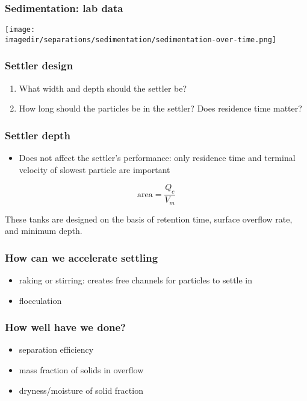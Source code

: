 \begin{frame}\frametitle{Sedimentation: lab data}
	\begin{center}
		\texttt{[image: \\imagedir/separations/sedimentation/sedimentation-over-time.png]}
	\end{center}
\end{frame}

\begin{frame}\frametitle{Settler design}
	\begin{enumerate}
		\item	What width and depth should the settler be?
		\item	How long should the particles be in the settler? Does residence time matter?
	\end{enumerate}
\end{frame}

\begin{frame}\frametitle{Settler depth}
	\begin{itemize}
		\item	Does not affect the settler's performance: only residence time and terminal velocity of slowest particle are important
	\end{itemize}
	
	\[
		\text{area} = \frac{Q_c}{V_m}
	\]
	
	
	\vspace{12pt}
	These tanks are designed on the basis of retention time, surface overflow rate, and minimum depth. 
\end{frame}

\begin{frame}\frametitle{How can we accelerate settling}
	\begin{itemize}
		\item	raking or stirring: creates free channels for particles to settle in
		\item	flocculation
	\end{itemize}
\end{frame}

\begin{frame}\frametitle{How well have we done?}
	\begin{itemize}
		\item	separation efficiency
		\item	mass fraction of solids in overflow
		\item	dryness/moisture of solid fraction
	\end{itemize}
\end{frame}

